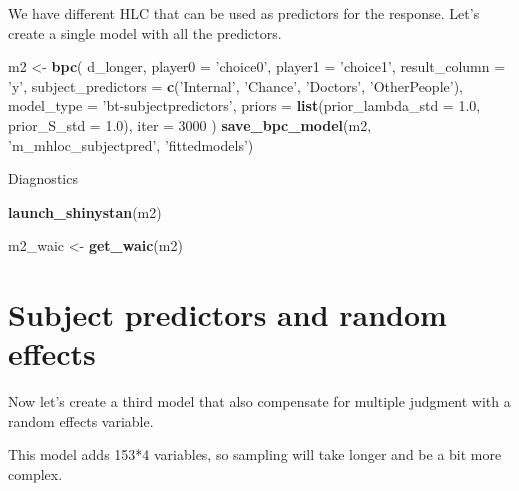 \documentclass[
]{book}
\newenvironment{Shaded}{\begin{snugshade}}{\end{snugshade}}
\newcommand{\DataTypeTok}[1]{\textcolor[rgb]{0.13,0.29,0.53}{#1}}
\newcommand{\DecValTok}[1]{\textcolor[rgb]{0.00,0.00,0.81}{#1}}
\newcommand{\FloatTok}[1]{\textcolor[rgb]{0.00,0.00,0.81}{#1}}
\newcommand{\KeywordTok}[1]{\textcolor[rgb]{0.13,0.29,0.53}{\textbf{#1}}}
\newcommand{\NormalTok}[1]{#1}
\newcommand{\StringTok}[1]{\textcolor[rgb]{0.31,0.60,0.02}{#1}}
\begin{document}
We have different HLC that can be used as predictors for the response. Let's create a single model with all the predictors.

\begin{Shaded}
\begin{Highlighting}[]
\NormalTok{m2 <-}
\StringTok{  }\KeywordTok{bpc}\NormalTok{(}
\NormalTok{    d_longer,}
    \DataTypeTok{player0 =} \StringTok{'choice0'}\NormalTok{,}
    \DataTypeTok{player1 =} \StringTok{'choice1'}\NormalTok{,}
    \DataTypeTok{result_column =} \StringTok{'y'}\NormalTok{,}
    \DataTypeTok{subject_predictors =} \KeywordTok{c}\NormalTok{(}\StringTok{'Internal'}\NormalTok{, }\StringTok{'Chance'}\NormalTok{, }\StringTok{'Doctors'}\NormalTok{, }\StringTok{'OtherPeople'}\NormalTok{),}
    \DataTypeTok{model_type =} \StringTok{'bt-subjectpredictors'}\NormalTok{,}
    \DataTypeTok{priors =} \KeywordTok{list}\NormalTok{(}\DataTypeTok{prior_lambda_std =} \FloatTok{1.0}\NormalTok{,}
                  \DataTypeTok{prior_S_std =} \FloatTok{1.0}\NormalTok{),}
    \DataTypeTok{iter =} \DecValTok{3000}
\NormalTok{  )}
\KeywordTok{save_bpc_model}\NormalTok{(m2, }\StringTok{'m_mhloc_subjectpred'}\NormalTok{, }\StringTok{'fittedmodels'}\NormalTok{)}
\end{Highlighting}
\end{Shaded}

Diagnostics

\begin{Shaded}
\begin{Highlighting}[]
\KeywordTok{launch_shinystan}\NormalTok{(m2)}
\end{Highlighting}
\end{Shaded}

\begin{Shaded}
\begin{Highlighting}[]
\NormalTok{m2_waic <-}\StringTok{ }\KeywordTok{get_waic}\NormalTok{(m2)}
\end{Highlighting}
\end{Shaded}

\hypertarget{subject-predictors-and-random-effects}{%
\section{Subject predictors and random effects}\label{subject-predictors-and-random-effects}}

Now let's create a third model that also compensate for multiple judgment with a random effects variable.

This model adds 153*4 variables, so sampling will take longer and be a bit more complex.
\end{document}
